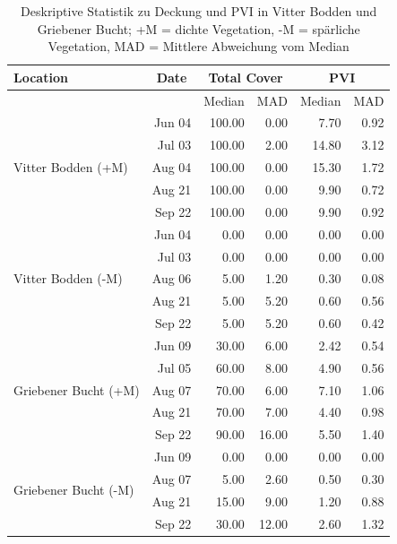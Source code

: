 \begin{table}[!htb]
\centering
\caption[Deskriptive Statistik, Deckung und PVI in Grieben und Vitte]{Deskriptive Statistik zu Deckung und PVI in Vitter Bodden und Griebener Bucht; +M = dichte Vegetation, -M = spärliche Vegetation, MAD = Mittlere Abweichung vom Median}
\begin{tabular}{lrrrrr}
\toprule
Location & \multicolumn{1}{c}{Date}	& \multicolumn{2}{c}{Total Cover} 	& \multicolumn{2}{c}{PVI}\\
\midrule
							&			& Median 		& MAD				& Median		& MAD\\
\midrule
\multirow{5}{*}{Vitter Bodden (+M)} & Jun 04 	& 100.00 		& 0.00				& 7.70			& 0.92\\
 							& Jul 03    & 100.00	    & 2.00				& 14.80			& 3.12\\
							& Aug 04	& 100.00		& 0.00				& 15.30			& 1.72\\
							& Aug 21	& 100.00		& 0.00				& 9.90			& 0.72\\
							& Sep 22	& 100.00		& 0.00				& 9.90			& 0.92\\
\midrule
\multirow{5}{*}{Vitter Bodden (-M)} & Jun 04	& 0.00			& 0.00				& 0.00			& 0.00\\
							& Jul 03	& 0.00			& 0.00				& 0.00			& 0.00\\
							& Aug 06	& 5.00			& 1.20				& 0.30			& 0.08\\
							& Aug 21	& 5.00			& 5.20				& 0.60			& 0.56\\
							& Sep 22	& 5.00			& 5.20				& 0.60			& 0.42\\
\midrule
\multirow{5}{*}{Griebener Bucht (+M)}& Jun 09	& 30.00			& 6.00				& 2.42			& 0.54\\
							& Jul 05	& 60.00			& 8.00				& 4.90			& 0.56\\
							& Aug 07	& 70.00			& 6.00				& 7.10			& 1.06\\
							& Aug 21	& 70.00			& 7.00				& 4.40			& 0.98\\
							& Sep 22	& 90.00			& 16.00				& 5.50			& 1.40\\
\midrule	
\multirow{4}{*}{Griebener Bucht (-M)}& Jun 09	& 0.00			& 0.00				& 0.00			& 0.00\\
							& Aug 07	& 5.00			& 2.60				& 0.50			& 0.30\\
							& Aug 21	& 15.00			& 9.00				& 1.20			& 0.88\\
							& Sep 22	& 30.00			& 12.00				& 2.60			& 1.32\\
\bottomrule
\end{tabular}
\label{tab:statistik_G,V_Deckung,PVI}
\end{table}

